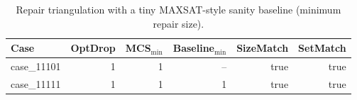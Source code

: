 \begin{table}[t]
\centering
\small
\begin{tabular}{lrrrrr}
\toprule
Case & OptDrop & MCS$_{\min}$ & Baseline$_{\min}$ & SizeMatch & SetMatch \\
\midrule
case\_11101 & 1 & 1 & -- & true & true \\
case\_11111 & 1 & 1 & 1 & true & true \\
\bottomrule
\end{tabular}
\caption{Repair triangulation with a tiny MAXSAT-style sanity baseline (minimum repair size).}
\label{tab:sen24-triangulation}
\end{table}
